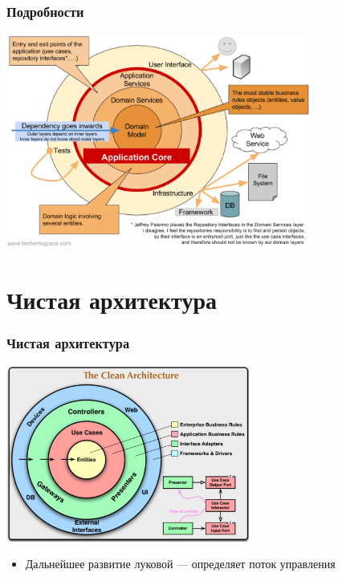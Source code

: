 \documentclass{../cscslides}
\begin{document}
    \begin{frame}
        \frametitle{Подробности}
        \begin{center}
            \includegraphics[width=0.75\textwidth]{onionArchitectureDetails.png}
        \end{center}
    \end{frame}

    \section{Чистая архитектура}

    \begin{frame}
        \frametitle{Чистая архитектура}
        \begin{center}
            \includegraphics[width=0.6\textwidth]{cleanArchitecture.png}
        \end{center}
        \begin{itemize}
            \item Дальнейшее развитие луковой --- определяет поток управления
        \end{itemize}
    \end{frame}
\end{document}
